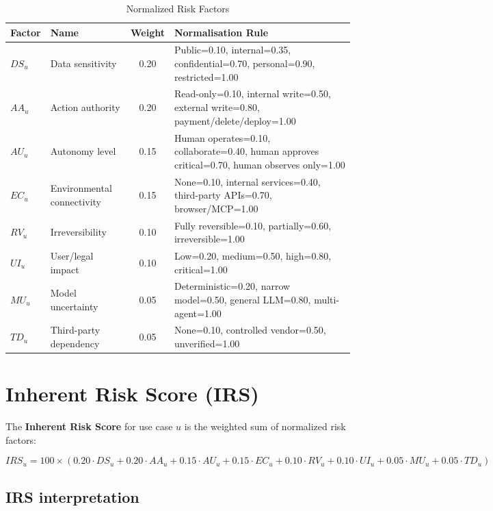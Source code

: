 \begin{table}[htbp]
\centering
\footnotesize
\caption{Normalized Risk Factors}
\label{tab:risk-factors}
\begin{tabularx}{\textwidth}{@{}l l c X@{}}
\toprule
\textbf{Factor} & \textbf{Name} & \textbf{Weight} & \textbf{Normalisation Rule} \\
\midrule
$DS_u$ & Data sensitivity & 0.20 & Public=0.10, internal=0.35, confidential=0.70, personal=0.90, restricted=1.00 \\
$AA_u$ & Action authority & 0.20 & Read-only=0.10, internal write=0.50, external write=0.80, payment/delete/deploy=1.00 \\
$AU_u$ & Autonomy level & 0.15 & Human operates=0.10, collaborate=0.40, human approves critical=0.70, human observes only=1.00 \\
$EC_u$ & Environmental connectivity & 0.15 & None=0.10, internal services=0.40, third-party APIs=0.70, browser/MCP=1.00 \\
$RV_u$ & Irreversibility & 0.10 & Fully reversible=0.10, partially=0.60, irreversible=1.00 \\
$UI_u$ & User/legal impact & 0.10 & Low=0.20, medium=0.50, high=0.80, critical=1.00 \\
$MU_u$ & Model uncertainty & 0.05 & Deterministic=0.20, narrow model=0.50, general LLM=0.80, multi-agent=1.00 \\
$TD_u$ & Third-party dependency & 0.05 & None=0.10, controlled vendor=0.50, unverified=1.00 \\
\bottomrule
\end{tabularx}
\end{table}

\section{Inherent Risk Score (IRS)}

The \textbf{Inherent Risk Score} for use case $u$ is the weighted sum of
normalized risk factors:

\begin{equation}
\boxed{
IRS_u = 100 \times \left(
  0.20 \cdot DS_u + 
  0.20 \cdot AA_u + 
  0.15 \cdot AU_u + 
  0.15 \cdot EC_u + 
  0.10 \cdot RV_u + 
  0.10 \cdot UI_u + 
  0.05 \cdot MU_u + 
  0.05 \cdot TD_u
\right)
}
\label{eq:irs}
\end{equation}

\subsection{IRS interpretation}

